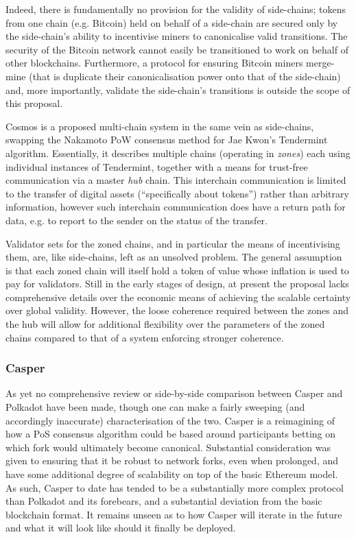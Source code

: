 \documentclass{beamer}
\makeatletter
\newcommand*\eg{e.g.\@\xspace}
\makeatother
\begin{document}
\begin{frame}
Indeed, there is fundamentally no provision for the validity of side-chains; tokens from one chain (\eg Bitcoin) held on behalf of a side-chain are secured only by the side-chain's ability to incentivise miners to canonicalise valid transitions. The security of the Bitcoin network cannot easily be transitioned to work on behalf of other blockchains. Furthermore, a protocol for ensuring Bitcoin miners merge-mine (that is duplicate their canonicalisation power onto that of the side-chain) and, more importantly, validate the side-chain's transitions is outside the scope of this proposal.

Cosmos \cite{kwon2016cosmos} is a proposed multi-chain system in the same vein as side-chains, swapping the Nakamoto PoW consensus method for Jae Kwon's Tendermint algorithm. Essentially, it describes multiple chains (operating in \textit{zones}) each using individual instances of Tendermint, together with a means for trust-free communication via a master \textit{hub} chain. This interchain communication is limited to the transfer of digital assets (``specifically about tokens'') rather than arbitrary information, however such interchain communication does have a return path for data, e.g. to report to the sender on the status of the transfer.

Validator sets for the zoned chains, and in particular the means of incentivising them, are, like side-chains, left as an unsolved problem. The general assumption is that each zoned chain will itself hold a token of value whose inflation is used to pay for validators. Still in the early stages of design, at present the proposal lacks comprehensive details over the economic means of achieving the scalable certainty over global validity. However, the loose coherence required between the zones and the hub will allow for additional flexibility over the parameters of the zoned chains compared to that of a system enforcing stronger coherence.

\subsubsection{Casper}\label{casper}

As yet no comprehensive review or side-by-side comparison between Casper \cite{buterin2016mauve} and Polkadot have been made, though one can make a fairly sweeping (and accordingly inaccurate) characterisation of the two. Casper is a reimagining of how a PoS consensus algorithm could be based around participants betting on which fork would ultimately become canonical. Substantial consideration was given to ensuring that it be robust to network forks, even when prolonged, and have some additional degree of scalability on top of the basic Ethereum model. As such, Casper to date has tended to be a substantially more complex protocol than Polkadot and its forebears, and a substantial deviation from the basic blockchain format. It remains unseen as to how Casper will iterate in the future and what it will look like should it finally be deployed.


\end{frame}
\end{document}
